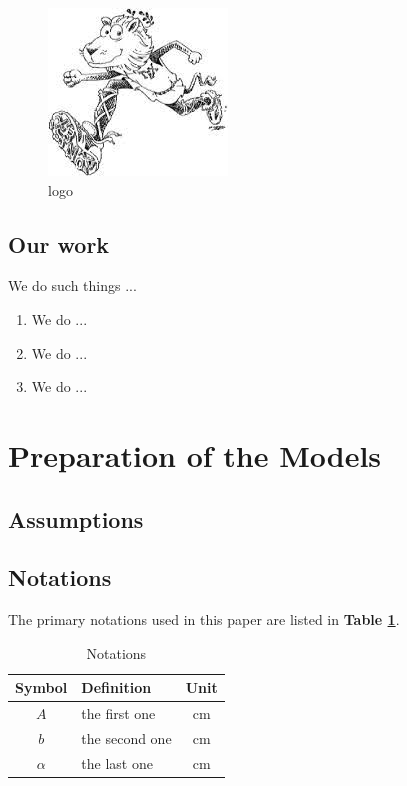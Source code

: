 \documentclass[12pt]{article}
\begin{document}
\begin{figure}[!htbp]
	\centering
	\includegraphics{logo}
	\caption{logo}
	\label{cap}
\end{figure}

\subsection{Our work}
We do such things\cite{LinA} ...

\begin{enumerate}[\bfseries 1.]
    \item We do ...
    \item We do ...
    \item We do ...
\end{enumerate}

\section{Preparation of the Models}
\subsection{Assumptions}

\subsection{Notations}
The primary notations used in this paper are listed in \textbf{Table \ref{tb:notation}}.
\begin{table}[!htbp]
\begin{center}
\caption{Notations}
\begin{tabular}{clc}
	\toprule
	\multicolumn{1}{m{3cm}}{\centering Symbol}
	&\multicolumn{1}{m{8cm}}{\centering Definition}
	&\multicolumn{1}{m{3cm}}{\centering Unit}\\
	\midrule
	$A$&the first one&cm\\
	$b$&the second one&cm\\
	$\alpha$ &the last one&cm\\
	\bottomrule
\end{tabular}\label{tb:notation}
\end{center}
\end{table}
\end{document}
